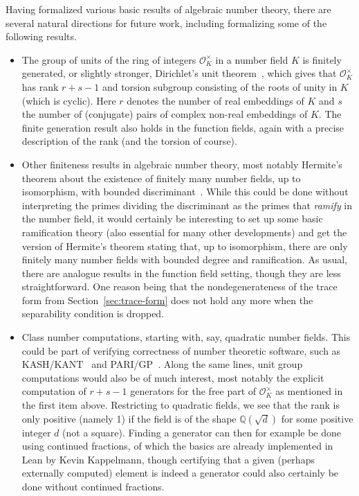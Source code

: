 \documentclass[sn-mathphys]{sn-jnl}%
\newcommand*{\OK}[1][K]{\mathcal{O}_{#1}}
\newcommand{\QQ}{\mathbb{Q}}
\begin{document}
Having formalized various basic results of algebraic number theory, there are several natural directions for future work, including formalizing some of the following results.
\begin{itemize}

\item The group of units of the ring of integers $\OK^{\times}$ in a number field $K$ is finitely generated, or slightly stronger, Dirichlet's unit theorem~\cite[Theorem 7.4]{Neukirch}, which gives that $\OK^{\times}$ has rank $r+s-1$ and torsion subgroup consisting of the roots of unity in $K$ (which is cyclic). Here $r$ denotes the number of real embeddings of $K$ and $s$ the number of (conjugate) pairs of complex non-real embeddings of $K$. The finite generation result also holds in the function fields, again with a precise description of the rank (and the torsion of course).

\item Other finiteness results in algebraic number theory, most notably Hermite's theorem about the existence of finitely many number fields, up to isomorphism,
with bounded discriminant~\cite[Theorem 2.16]{Neukirch}. While this could be done without interpreting the primes dividing the discriminant as the primes that \emph{ramify} in the number field, it would certainly be interesting to set up some basic ramification theory (also essential for many other developments) and get the version of Hermite's theorem stating that, up to isomorphism, there are only finitely many number fields with bounded degree and ramification.
As usual, there are analogue results in the function field setting, though they are less straightforward. One reason being that the nondegenerateness of the trace form from Section~\ref{sec:trace-form} does not hold any more when the separability condition is dropped.

\item Class number computations, starting with, say, quadratic number fields.
This could be part of verifying correctness of number theoretic software, such as KASH/KANT~\cite{kash} and PARI/GP~\cite{PARI2}.
Along the same lines, unit group computations would also be of much interest, most notably the explicit computation of $r+s-1$ generators for the free part of $\OK^{\times}$ as mentioned in the first item above.
Restricting to quadratic fields, we see that the rank is only positive (namely 1) if the field is of the shape $\QQ(\sqrt{d})$ for some positive integer $d$ (not a square).
Finding a generator can then for example be done using continued fractions, of which the basics are already implemented in Lean by Kevin Kappelmann, though certifying that a given (perhaps externally computed) element is indeed a generator could also certainly be done without continued fractions.


\end{itemize}
\end{document}

